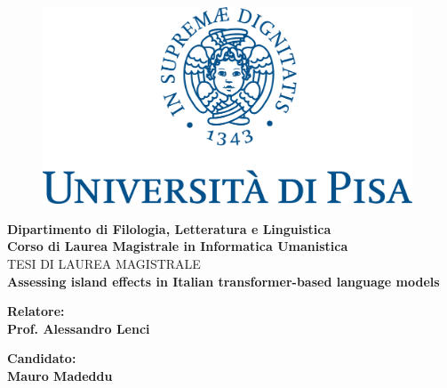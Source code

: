 \begin{titlepage} %
\begin{figure}[t] %
    \centering\includegraphics[width=0.98\textwidth]{marchio_unipi_pant541.png}
\end{figure}
\vspace{20mm}

\begin{Large}
 \begin{center}
	\textbf{Dipartimento di Filologia, Letteratura e Linguistica \\ Corso di Laurea Magistrale in Informatica Umanistica \\}
	\vspace{20mm}
    {\LARGE{TESI DI LAUREA MAGISTRALE}}\\
	\vspace{10mm}
	{\huge{\bf Assessing island effects in Italian transformer-based language models}}\\
\end{center}
\end{Large}


\vspace{36mm}
\begin{minipage}[t]{0.47\textwidth}
	{\large{\bf Relatore:\\ Prof. Alessandro Lenci}}
\end{minipage}
\hfill
\begin{minipage}[t]{0.47\textwidth}\raggedleft
	{\large{\bf Candidato: \\ Mauro Madeddu\\ }}
\end{minipage}

\vspace{25mm}

\hrulefill

\vspace{5mm}


\end{titlepage}